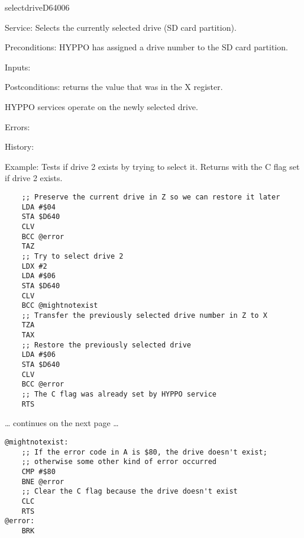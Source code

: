 \newpage
\begin{hyppotrap}{selectdrive}{D640}{06}
\item [Service:]
  Selects the currently selected drive (SD card partition).
\item [Preconditions:]
  HYPPO has assigned a drive number to the SD card partition.
\item [Inputs:]
\item [Postconditions:]
   returns the value that was in the X register.

  HYPPO services operate on the newly selected drive.
\item [Errors:]
\item [History:]
\item [Example:]
  Tests if drive 2 exists by trying to select it. Returns with the C flag set if
  drive 2 exists.

\begin{tcolorbox}[colback=black,coltext=white]
\verbatimfont{\codefont}
\begin{verbatim}
    ;; Preserve the current drive in Z so we can restore it later
    LDA #$04
    STA $D640
    CLV
    BCC @error
    TAZ
    ;; Try to select drive 2
    LDX #2
    LDA #$06
    STA $D640
    CLV
    BCC @mightnotexist
    ;; Transfer the previously selected drive number in Z to X
    TZA
    TAX
    ;; Restore the previously selected drive
    LDA #$06
    STA $D640
    CLV
    BCC @error
    ;; The C flag was already set by HYPPO service
    RTS
\end{verbatim}
\end{tcolorbox}

\ldots{} continues on the next page \ldots

\begin{tcolorbox}[colback=black,coltext=white]
\verbatimfont{\codefont}
\begin{verbatim}
@mightnotexist:
    ;; If the error code in A is $80, the drive doesn't exist;
    ;; otherwise some other kind of error occurred
    CMP #$80
    BNE @error
    ;; Clear the C flag because the drive doesn't exist
    CLC
    RTS
@error:
    BRK
\end{verbatim}
\end{tcolorbox}
\end{hyppotrap}


